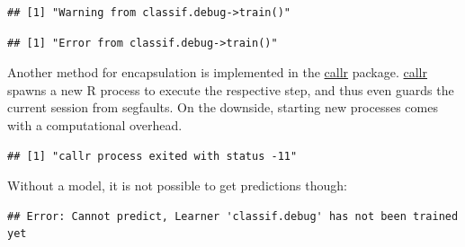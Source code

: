 \documentclass[]{scrbook}
\newenvironment{Shaded}{\begin{snugshade}}{\end{snugshade}}
\newcommand{\DataTypeTok}[1]{\textcolor[rgb]{0.13,0.29,0.53}{#1}}
\newcommand{\DecValTok}[1]{\textcolor[rgb]{0.00,0.00,0.81}{#1}}
\newcommand{\KeywordTok}[1]{\textcolor[rgb]{0.13,0.29,0.53}{\textbf{#1}}}
\newcommand{\NormalTok}[1]{#1}
\newcommand{\OperatorTok}[1]{\textcolor[rgb]{0.81,0.36,0.00}{\textbf{#1}}}
\newcommand{\StringTok}[1]{\textcolor[rgb]{0.31,0.60,0.02}{#1}}
\renewenvironment{Shaded} {\begin{snugshade}\small} {\end{snugshade}}
\begin{document}
\begin{verbatim}
## [1] "Warning from classif.debug->train()"
\end{verbatim}

\begin{Shaded}
\end{Shaded}

\begin{verbatim}
## [1] "Error from classif.debug->train()"
\end{verbatim}

Another method for encapsulation is implemented in the \href{https://cran.r-project.org/package=callr}{callr} package.
\href{https://cran.r-project.org/package=callr}{callr} spawns a new R process to execute the respective step, and thus even guards the current session from segfaults.
On the downside, starting new processes comes with a computational overhead.

\begin{Shaded}
\end{Shaded}

\begin{verbatim}
## [1] "callr process exited with status -11"
\end{verbatim}

Without a model, it is not possible to get predictions though:

\begin{Shaded}
\end{Shaded}

\begin{verbatim}
## Error: Cannot predict, Learner 'classif.debug' has not been trained yet
\end{verbatim}
\end{document}
